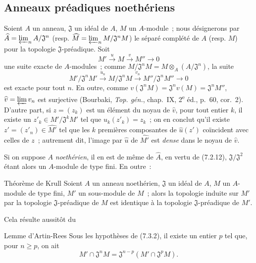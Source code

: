 \subsection{Anneaux préadiques noethériens}
\label{subsection:0.7.3-fr}

\begin{env}[7.3.1]
\label{0.7.3.1-fr}
Soient $A$ un anneau, $\mathfrak J$ un idéal de $A$, $M$ un $A$-module~;
nous désignerons par
$\widehat A=\varprojlim_n A/\mathfrak J^n$ (resp.
$\widehat M=\varprojlim_n M/\mathfrak J^nM$) le séparé complété de $A$
(resp. $M$) pour la topologie $\mathfrak J$-préadique. Soit
\[
  M'\xrightarrow{u}M\xrightarrow{v}M''\to0
\]
une suite exacte de $A$-modules~; comme
$M/\mathfrak J^nM=M\otimes_A(A/\mathfrak J^n)$, la suite
\[
  M'/\mathfrak J^nM'\xrightarrow{u_n}
  M/\mathfrak J^nM\xrightarrow{v_n}
  M''/\mathfrak J^nM''\to0
\]
est exacte pour tout $n$. En outre, comme
$v(\mathfrak J^nM)=\mathfrak J^nv(M)=\mathfrak J^nM''$,
$\widehat v=\varprojlim v_n$ est surjective (Bourbaki,
\emph{Top. gén.}, chap.~IX, 2\textsuperscript{e} éd., p.~60, cor.~2).
D'autre part, si $z=(z_k)$ est un élément du noyau de $\widehat v$, pour tout
entier $k$, il existe un $z'_k\in M'/\mathfrak J^kM'$ tel que
$u_k(z'_k)=z_k$~; on en conclut qu'il existe
$z'=(z'_n)\in\widehat{M'}$ tel que les $k$ premières composantes de
$\widehat u(z')$ coïncident avec celles de $z$~; autrement dit, l'image par
$\widehat u$ de $\widehat{M'}$ est \emph{dense} dans le noyau de
$\widehat v$.

Si on suppose $A$ \emph{noethérien}, il en est de même de $\widehat A$, en
vertu de (7.2.12), $\mathfrak J/\mathfrak J^2$ étant alors un $A$-module de
type fini. En outre~:
\end{env}

\begin{namedtheorem}[7.3.2]{Théorème de Krull}
\label{0.7.3.2-fr}
Soient $A$ un anneau noethérien, $\mathfrak J$ un idéal de $A$, $M$ un
$A$-module de type fini, $M'$ un sous-module de $M$~; alors la topologie
induite sur $M'$ par la topologie $\mathfrak J$-préadique de $M$ est identique
à la topologie $\mathfrak J$-préadique de $M'$.
\end{namedtheorem}

Cela résulte aussitôt du

\begin{namedlemma}[7.3.2.1]{Lemme d'Artin-Rees}
\label{0.7.3.2.1-fr}
Sous les hypothèses de (7.3.2), il existe un entier $p$ tel que, pour
$n\geq p$, on ait
\[
  M'\cap\mathfrak J^nM=\mathfrak J^{n-p}
  (M'\cap\mathfrak J^pM).
\]
\end{namedlemma}


